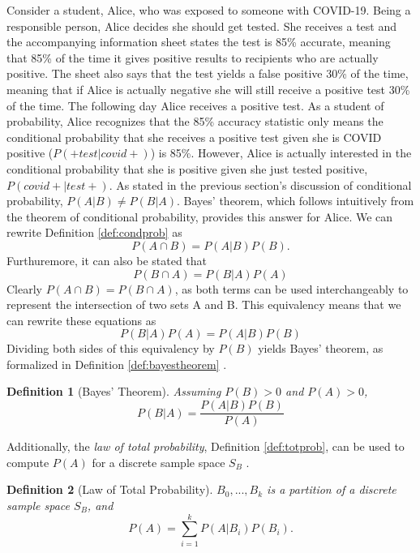 \documentclass[
  12pt,
]{book}
\theoremstyle{definition}
\newtheorem{definition}{Definition}[chapter]
\theoremstyle{definition}
\theoremstyle{definition}
\theoremstyle{remark}
\begin{document}
Consider a student, Alice, who was exposed to someone with COVID-19.
Being a responsible person, Alice decides she should get tested.
She receives a test and the accompanying information sheet states the test is 85\% accurate, meaning that 85\% of the time it gives positive results to recipients who are actually positive. The sheet also says that the test yields a false positive 30\% of the time, meaning that if Alice is actually negative she will still receive a positive test 30\% of the time.
The following day Alice receives a positive test.
As a student of probability, Alice recognizes that the 85\% accuracy statistic only means the conditional probability that she receives a positive test given she is COVID positive (\(P(+ test|covid+)\)) is 85\%.
However, Alice is actually interested in the conditional probability that she is positive given she just tested positive, \(P(covid+|test+)\).
As stated in the previous section's discussion of conditional probability, \(P(A|B) \neq P(B|A)\).
Bayes' theorem, which follows intuitively from the theorem of conditional probability, provides this answer for Alice.
We can rewrite Definition \ref{def:condprob} as
\[P(A \cap B)=P(A|B)P(B).\]
Furthuremore, it can also be stated that
\[P(B \cap A)=P(B|A)P(A)\]
Clearly \(P(A \cap B)=P(B \cap A)\), as both terms can be used interchangeably to represent the intersection of two sets A and B.
This equivalency means that we can rewrite these equations as
\[P(B|A)P(A)=P(A|B)P(B)\]
Dividing both sides of this equivalency by \(P(B)\) yields Bayes' theorem, as formalized in Definition \ref{def:bayestheorem} \citep{Junker2003}.

\begin{definition}[Bayes' Theorem]
\protect\hypertarget{def:bayestheorem}{}{\label{def:bayestheorem} {} }\emph{Assuming \(P(B)>0\) and \(P(A)>0\),}
\[P(B|A)=\frac{P(A|B)P(B)}{P(A)}\]
\end{definition}

Additionally, the \emph{law of total probability}, Definition \ref{def:totprob}, can be used to compute \(P(A)\) for a discrete sample space \(S_{B}\) \citep{Wasserman2004}.

\begin{definition}[Law of Total Probability]
\protect\hypertarget{def:totprob}{}{\label{def:totprob} {} }\emph{\(B_{0},...,B_{k}\) is a partition of a discrete sample space \(S_{B}\), and}
\[P(A)=\sum_{i=1}^{k}P(A|B_{i})P(B_{i}).\]
\end{definition}
\end{document}
